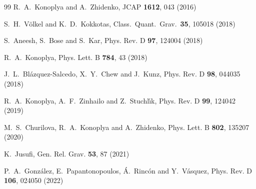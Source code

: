 \documentclass[a4paper,12pt]{article}
\begin{document}
\begin{thebibliography}{99}
  R.~A.~Konoplya and A.~Zhidenko,
  JCAP {\bf 1612}, 043 (2016)
  
  S.~H.~V\"olkel and K.~D.~Kokkotas,
  Class.\ Quant.\ Grav.\  {\bf 35}, 105018 (2018)

S.~Aneesh, S.~Bose and S.~Kar,
Phys. Rev. D \textbf{97}, 124004 (2018)

R.~A.~Konoplya,
Phys. Lett. B \textbf{784}, 43 (2018)

J.~L.~Bl\'azquez-Salcedo, X.~Y.~Chew and J.~Kunz,
Phys. Rev. D \textbf{98}, 044035 (2018)

R.~A.~Konoplya, A.~F.~Zinhailo and Z.~Stuchl\'\i{}k,
Phys. Rev. D \textbf{99}, 124042 (2019)

M.~S.~Churilova, R.~A.~Konoplya and A.~Zhidenko,
Phys. Lett. B \textbf{802}, 135207 (2020)

K.~Jusufi,
Gen. Rel. Grav. \textbf{53}, 87 (2021)

P.~A.~Gonz\'alez, E.~Papantonopoulos, \'A.~Rinc\'on and Y.~V\'asquez,
Phys. Rev. D \textbf{106}, 024050 (2022)


\end{thebibliography}
\end{document}

